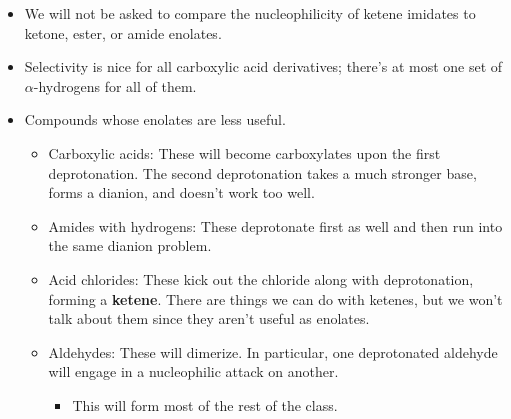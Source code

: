 \documentclass[../notes.tex]{subfiles}
\begin{document}
\begin{itemize}
\begin{itemize}
    \end{itemize}
    \item We will not be asked to compare the nucleophilicity of ketene imidates to ketone, ester, or amide enolates.
    \item Selectivity is nice for all carboxylic acid derivatives; there's at most one set of $\alpha$-hydrogens for all of them.
    \item Compounds whose enolates are less useful.
    \begin{itemize}
        \item Carboxylic acids: These will become carboxylates upon the first deprotonation. The second deprotonation takes a much stronger base, forms a dianion, and doesn't work too well.
        \item Amides with hydrogens: These deprotonate first as well and then run into the same dianion problem.
        \item Acid chlorides: These kick out the chloride along with deprotonation, forming a \textbf{ketene}. There are things we can do with ketenes, but we won't talk about them since they aren't useful as enolates.
        \item Aldehydes: These will dimerize. In particular, one deprotonated aldehyde will engage in a nucleophilic attack on another.
        \begin{itemize}
            \item This will form most of the rest of the class.
        \end{itemize}
    \end{itemize}
\end{itemize}
\end{document}
